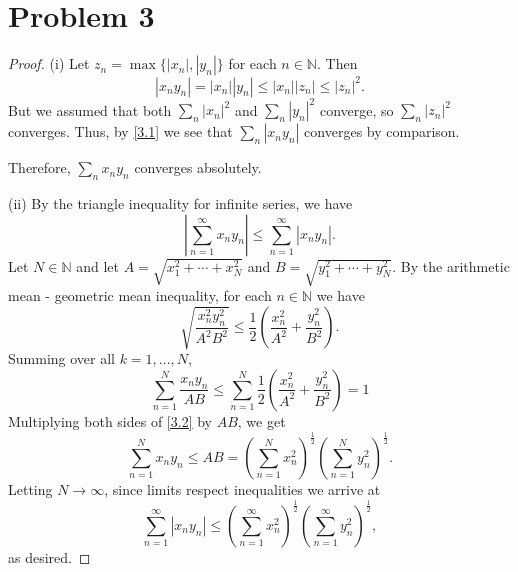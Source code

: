 \documentclass{article}
\newcommand{\N}{\mathbb{N}} %
\begin{document}
\section*{Problem 3}
\begin{proof}
	(i) Let $z_n = \max\{|x_n|, |y_n|\}$ for each $n \in \N$. Then
	\begin{equation} \label{3.1}
		|x_n y_n| = |x_n||y_n| \leq |x_n||z_n| \leq |z_n|^2.
	\end{equation}
	But we assumed that both $\sum_n |x_n|^2$ and $\sum_n |y_n|^2$ converge, so $\sum_n |z_n|^2$ converges. Thus, by \eqref{3.1} we see that $\sum_n |x_n y_n|$ converges by comparison.
	
	Therefore, $\sum_n x_n y_n$ converges absolutely.
	
	(ii) By the triangle inequality for infinite series, we have
	\begin{equation}
		\left|\sum_{n=1}^{\infty} x_n y_n \right| \leq \sum_{n=1}^{\infty}|x_n y_n|.
	\end{equation}
	Let $N \in \N$ and let $A = \sqrt{x_1^2 + \cdots + x_N^2}$ and $B = \sqrt{y_1^2 + \cdots + y_N^2}$. By the arithmetic mean - geometric mean inequality, for each $n \in \N$ we have
	\begin{equation}
		\sqrt{\frac{x_n^2 y_n^2}{A^2 B^2}} \leq \frac{1}{2}\left(\frac{x_n^2}{A^2} + \frac{y_n^2}{B^2}\right).
	\end{equation}
	Summing over all $k = 1, ..., N$,
	\begin{equation} \label{3.2}
		\sum_{n=1}^N \frac{x_n y_n}{AB} \leq \sum_{n=1}^N \frac{1}{2}\left(\frac{x_n^2}{A^2} + \frac{y_n^2}{B^2}\right) = 1
	\end{equation}
	Multiplying both sides of \eqref{3.2} by $AB$, we get
	\begin{equation}
		\sum_{n=1}^N x_n y_n \leq AB = \left(\sum_{n=1}^N x_n^2\right)^\frac{1}{2}\left(\sum_{n=1}^N y_n^2\right)^\frac{1}{2}.
	\end{equation}
	Letting $N \to \infty$, since limits respect inequalities we arrive at
	\begin{equation}
		\sum_{n=1}^{\infty}|x_n y_n| \leq \left(\sum_{n=1}^{\infty}x_n^2\right)^\frac{1}{2}\left(\sum_{n=1}^{\infty}y_n^2\right)^\frac{1}{2},
	\end{equation}
	as desired.
\end{proof}

\end{document}
